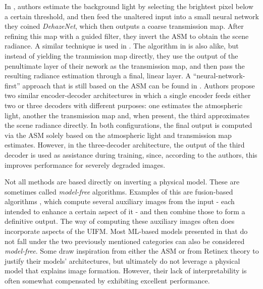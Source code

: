 \documentclass[twocolumn,twoside,a4paper,10pt]{IEEEtran}
\begin{document}
In \cite{7539399}, authors estimate the background light by selecting the brightest pixel below a certain threshold, and then feed the unaltered input into a small neural network they coined \textit{DehazeNet}, which then outputs a coarse transmission map. After refining this map with a guided filter, they invert the ASM to obtain the scene radiance. A similar technique
is used in \cite{8450630}.
The algorithm in \cite{9190777} is also alike, but instead of yielding the tranmission map directly, they use the output
of the penultimate layer of their nework as the transmission map, and then pass
the resulting radiance estimation through a final, linear layer. A ``neural-network-first'' approach that is still based on the ASM can be found in 
\cite{guo2019dense}. Authors propose two similar encoder-decoder architectures in which a single encoder feeds either two or three decoders with different purposes: one estimates the atmospheric light, another the transmission map and,
when present, the third approximates the scene radiance directly. In both configurations,
the final output is computed via the ASM solely based on the atmospheric light
and transmission map estimates. However, in the three-decoder architecture, the
output of the third decoder is used as assistance during training, since, according to the authors, this
improves performance for severely degraded images.

Not all methods are based directly on inverting a physical model. These are sometimes called \textit{model-free} algorithms. Examples of this are fusion-based algorithms \cite{6247661,ancuti2017color}, which compute several auxiliary
images from the input - each intended to enhance a certain aspect of it - and then combine those to form a definitive output. The way of computing these auxiliary images often does incorporate aspects of the UIFM. Most ML-based
models presented in \cite{10.1145/3576918} that do not fall under the two previously mentioned categories can also be considered \textit{model-free}. Some draw inspiration from either the ASM \cite{Li_2017_ICCV} or 
from Retinex theory \cite{9274531} to justify their models' architectures, but 
ultimately do not leverage a physical model that explains image formation. 
However, their lack
of interpretability is often somewhat compensated by exhibiting excellent performance.
\end{document}
